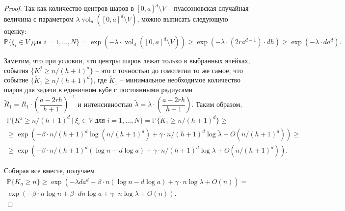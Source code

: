 \documentclass[12pt]{article}
\theoremstyle{plain}
\theoremstyle{definition}
\theoremstyle{remark}
\def\geq{\geqslant}
\DeclareMathOperator{\vol}{vol}
\newcommand{\PP}{\mathbb{P}}
\newcommand{\til}{\widetilde}
\begin{document}
\begin{proof}
Так как количество центров шаров в $[0, a]^d \setminus V$ -- пуассоновская случайная величина с параметром $\lambda\vol_d([0, a]^d\setminus V)$, можно выписать следующую оценку:
\begin{equation*}
    \PP\{\xi_i \in V \text{ для } i = 1, \ldots, N\} = \exp(-\lambda\cdot\vol_d([0,a]^d\setminus V)) \geq \exp(-\lambda\cdot (2ra^{d-1}) \cdot dh) \geq \exp(-\lambda\cdot da^d).
\end{equation*}{}

Заметим, что при условии, что центры шаров лежат только в выбранных ячейках, события $\{K^j\geq n/(h+1)^d\}$ -- это с точностью до гомотетии то же самое, что событие $\{\til K_1 \geq n/(h+1)^d\}$, где $\til K_1$ -- минимальное необходимое количество шаров для задачи в единичном кубе с постоянными радиусами $\til R_1 = R_1\cdot \left(\dfrac{a-2rh}{h+1}\right)^{-1}$ и интенсивностью $\til\lambda = \lambda\cdot\left(\dfrac{a-2rh}{h+1}\right)$. Таким образом,  
\begin{multline*}
    \PP\{K^j \geq n/(h+1)^d\ | \ \xi_i \in V \text{ для } i = 1, \ldots, N\} =
    \PP\{\til K_1 \geq n/(h+1)^d\} \geq\\ 
    \geq \exp \left(-\beta\cdot n/(h+1)^d\log (n/(h+1)^d) + \gamma\cdot n/(h+1)^d\log\til\lambda + O(n/(h+1)^d)\right) \geq\\
    \geq \exp \left(-\beta\cdot n/(h+1)^d(\log n - d\log a) + \gamma\cdot n/(h+1)^d\log\lambda + O(n/(h+1)^d)\right).
\end{multline*}{}

Собирая все вместе, получаем 
\begin{multline*}
    \PP\{K_a \geq n\} \geq \exp \left(-\lambda da^d-\beta\cdot n(\log n - d\log a) + \gamma\cdot n\log\lambda + O(n)\right) = \\
    \exp \left(-\beta\cdot n\log n + \beta\cdot dn\log a + \gamma\cdot n\log\lambda + O(n)\right).
\end{multline*}{}
\end{proof}{}
\end{document}
